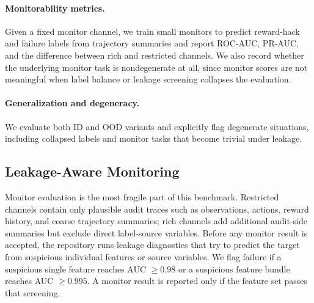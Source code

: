 \paragraph{Monitorability metrics.}
Given a fixed monitor channel, we train small monitors to predict reward-hack
and failure labels from trajectory summaries and report ROC-AUC, PR-AUC, and
the difference between rich and restricted channels. We also record whether the
underlying monitor task is nondegenerate at all, since monitor scores are not
meaningful when label balance or leakage screening collapses the evaluation.

\paragraph{Generalization and degeneracy.}
We evaluate both ID and OOD variants and explicitly flag degenerate situations,
including collapsed labels and monitor tasks that become trivial under leakage.

\subsection{Leakage-Aware Monitoring}
Monitor evaluation is the most fragile part of this benchmark. Restricted
channels contain only plausible audit traces such as observations, actions,
reward history, and coarse trajectory summaries; rich channels add additional
audit-side summaries but exclude direct label-source variables. Before any
monitor result is accepted, the repository runs leakage diagnostics that try to
predict the target from suspicious individual features or source variables. We
flag failure if a suspicious single feature reaches AUC $\ge 0.98$ or a
suspicious feature bundle reaches AUC $\ge 0.995$. A monitor result is reported
only if the feature set passes that screening.
